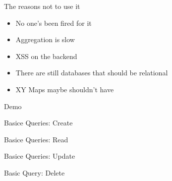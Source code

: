 \documentclass{beamer}
\begin{document}
\begin{frame}{The reasons not to use it}

\begin{itemize}
\item No one's been fired for it
\item Aggregation is slow
\item XSS on the backend
\item There are still databases that should be relational
\item XY Maps maybe shouldn't have
\end{itemize}

\end{frame}


\begin{frame}%

\begin{center}
   Demo
\end{center}

\end{frame}

\begin{frame}{Basice Queries: Create}


\end{frame}


\begin{frame}{Basice Queries: Read}


\end{frame}


\begin{frame}{Basice Queries: Update}


\end{frame}


\begin{frame}{Basic Query: Delete}


\end{frame}
\end{document}
